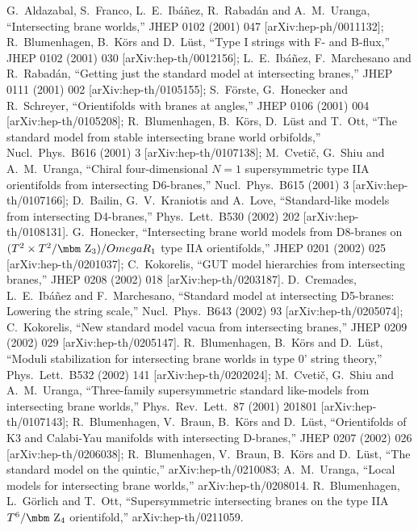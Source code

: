 \documentclass[a4paper,12pt]{article}
\def\bb#1{\hbox{\mbm #1}}
\begin{document}
\begin{thebibliography}{77}
G.~Aldazabal, S.~Franco, L.~E.~Ib\'a\~{n}ez, R.~Rabad\'an and A.~M.~Uranga,
``Intersecting brane worlds,''
JHEP 0102 (2001) 047
[arXiv:hep-ph/0011132];
R.~Blumenhagen, B.~K\"ors and D.~L\"ust,
``Type I strings with F- and B-flux,''
JHEP 0102 (2001) 030
[arXiv:hep-th/0012156];
L.~E.~Ib\'a\~nez, F.~Marchesano and R.~Rabad\'an,
``Getting just the standard model at intersecting branes,''
JHEP 0111 (2001) 002
[arXiv:hep-th/0105155];
S.~F\"orste, G.~Honecker and R.~Schreyer,
``Orientifolds with branes at angles,''
JHEP 0106 (2001) 004
[arXiv:hep-th/0105208];
R.~Blumenhagen, B.~K\"ors, D.~L\"ust and T.~Ott,
``The standard model from stable intersecting brane world orbifolds,''
Nucl.\ Phys.\ B616 (2001) 3
[arXiv:hep-th/0107138];
M.~Cveti\v{c}, G.~Shiu and A.~M.~Uranga,
``Chiral four-dimensional $N = 1$ supersymmetric type 
IIA orientifolds from  intersecting D6-branes,''
Nucl.\ Phys.\ B615 (2001) 3
[arXiv:hep-th/0107166];
D.~Bailin, G.~V.~Kraniotis and A.~Love,
``Standard-like models from intersecting D4-branes,''
Phys.\ Lett.\ B530 (2002) 202
[arXiv:hep-th/0108131].
G.~Honecker,
``Intersecting brane world models from D8-branes on  
$(T^2 \times T^2/\bb{Z}_3)/Omega R_1$ type IIA orientifolds,''
JHEP 0201 (2002) 025
[arXiv:hep-th/0201037];
C.~Kokorelis,
``GUT model hierarchies from intersecting branes,''
JHEP 0208 (2002) 018
[arXiv:hep-th/0203187].
D.~Cremades, L.~E.~Ib\'a\~nez and F.~Marchesano,
``Standard model at intersecting D5-branes: Lowering the string scale,''
Nucl.\ Phys.\ B643 (2002) 93
[arXiv:hep-th/0205074];
C.~Kokorelis,
``New standard model vacua from intersecting branes,''
JHEP 0209 (2002) 029
[arXiv:hep-th/0205147].
R.~Blumenhagen, B.~K\"ors and D.~L\"ust,
``Moduli stabilization for intersecting brane worlds 
in type 0' string  theory,''
Phys.\ Lett.\ B532 (2002) 141
[arXiv:hep-th/0202024];
M.~Cveti\v{c}, G.~Shiu and A.~M.~Uranga,
``Three-family supersymmetric standard like-models 
from intersecting  brane worlds,''
Phys.\ Rev.\ Lett.\  87 (2001) 201801
[arXiv:hep-th/0107143];
R.~Blumenhagen, V.~Braun, B.~K\"ors and D.~L\"ust,
``Orientifolds of K3 and Calabi-Yau manifolds with intersecting D-branes,''
JHEP 0207 (2002) 026
[arXiv:hep-th/0206038];
R.~Blumenhagen, V.~Braun, B.~K\"ors and D.~L\"ust,
``The standard model on the quintic,''
arXiv:hep-th/0210083;
A.~M.~Uranga,
``Local models for intersecting brane worlds,''
arXiv:hep-th/0208014.
R.~Blumenhagen, L.~G\"orlich and T.~Ott,
``Supersymmetric intersecting branes on the type IIA $T^6/\bb{Z}_4$  
orientifold,''
arXiv:hep-th/0211059.



\end{thebibliography}
\end{document}
